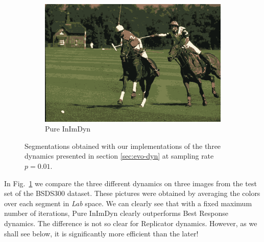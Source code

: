 \documentclass[11pt,a4paper]{article}
\begin{document}
\begin{figure}
\begin{subfigure}[b]{0.3\textwidth}
        \includegraphics[width=\textwidth]{figures/methods/inimdyn/361010_avg.png}
        \caption{Pure InImDyn}
    \end{subfigure}
       \caption{Segmentations obtained with our implementations of the three dynamics presented in section \ref{sec:evo-dyn} at sampling rate $p=0.01$.}
       \label{fig:results-dynamics}
\end{figure}

In Fig.~\ref{fig:results-dynamics} we compare the three different dynamics on three images from the test set of the BSDS300 dataset. These pictures were obtained by averaging the colors over each segment in \textit{Lab} space. We can clearly see that with a fixed maximum number of iterations, Pure InImDyn clearly outperforms Best Response dynamics. The difference is not so clear for Replicator dynamics. However, as we shall see below, it is significantly more efficient than the later!
\end{document}
